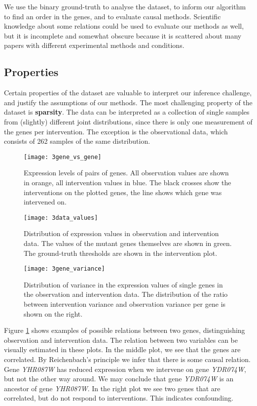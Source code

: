 We use the binary ground-truth to analyse the dataset, to inform our algorithm to find an order in the genes, and to evaluate causal methods. Scientific knowledge about some relations could be used to evaluate our methods as well, but it is incomplete and somewhat obscure because it is scattered about many papers with different experimental methods and conditions. 

\subsection{Properties}

Certain properties of the dataset are valuable to interpret our inference challenge, and justify the assumptions of our methods. The most challenging property of the dataset is \textbf{sparsity}. The data can be interpreted as a collection of single samples from (slightly) different joint distributions, since there is only one measurement of the genes per intervention. The exception is the observational data, which consists of 262 samples of the same distribution.

\begin{figure}[h]
    \centering
    \texttt{[image: 3gene\_vs\_gene]}
    \caption{Expression levels of pairs of genes. All observation values are shown in orange, all intervention values in blue. The black crosses show the interventions on the plotted genes, the line shows which gene was intervened on.}
    \label{fig:3:genevsgene}
\end{figure}

\begin{figure}[h]
    \centering
    \texttt{[image: 3data\_values]}
    \caption{Distribution of expression values in observation and intervention data. The values of the mutant genes themselves are shown in green. The ground-truth thresholds are shown in the intervention plot.}
    \label{fig:3:datavalues}
\end{figure}

\begin{figure}[h]
    \centering
    \texttt{[image: 3gene\_variance]}
    \caption{Distribution of variance in the expression values of single genes in the observation and intervention data. The distribution of the ratio between intervention variance and observation variance per gene is shown on the right.}
    \label{fig:3:datavariance}
\end{figure}

Figure \ref{fig:3:genevsgene} shows examples of possible relations between two genes, distinguishing observation and intervention data. The relation between two variables can be visually estimated in these plots. In the middle plot, we see that the genes are correlated. By Reichenbach's principle we infer that there is some causal relation. Gene \textit{YHR087W} has reduced expression when we intervene on gene \textit{YDR074W}, but not the other way around. We may conclude that gene \textit{YDR074W} is an ancestor of gene \textit{YHR087W}. In the right plot we see two genes that are correlated, but do not respond to interventions. This indicates confounding.

